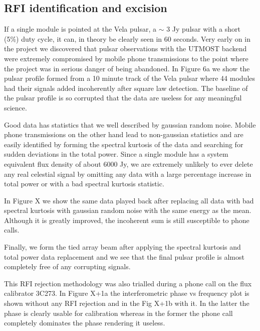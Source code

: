 \subsection{RFI identification and excision}

If a single module is pointed at the Vela pulsar, a $\sim$ 3 Jy pulsar with a short (5\%) duty cycle, it can, in theory be clearly seen in 60 seconds. Very early on in the project we discovered that pulsar observations with the UTMOST backend were extremely compromised by mobile phone transmissions to the point where the project was in serious danger of being abandoned. In Figure 6a we show the pulsar profile formed from a 10 minute track of the Vela pulsar where 44 modules had their signals added incoherently after square law detection. The baseline of the pulsar profile is so corrupted that the data are useless for any meaningful science.

Good data has statistics that we well described by gaussian random noise. Mobile phone transmissions on the other hand lead to non-gaussian statistics and are easily identified by forming the spectral kurtosis of the data and searching for sudden deviations in the total power. Since a single module has a system equivalent flux density of about 6000 Jy, we are extremely unlikely to ever delete any real celestial signal by omitting any data with a large percentage increase in total power or with a bad spectral kurtosis statistic.

In Figure X we show the same data played back after replacing all data with bad spectral kurtosis with gaussian random noise with the same energy as the mean. Although it is greatly improved, the incoherent sum is still susceptible to phone calls.

Finally, we form the tied array beam after applying the spectral kurtosis and total power data replacement and we see that the final pulsar profile is almost completely free of any corrupting signals. 

This RFI rejection methodology was also trialled during a phone call on the flux calibrator 3C273. In Figure X+1a the interferometric phase vs frequency plot is shown without any RFI rejection and in the Fig X+1b with it. In the latter the phase is clearly usable for calibration whereas in the former the phone call completely dominates the phase rendering it useless.



